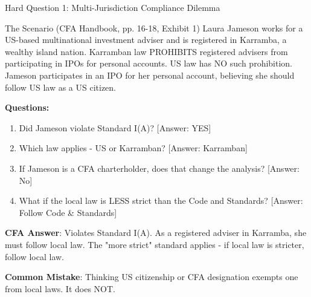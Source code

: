 \documentclass{beamer}
\begin{document}
	\begin{frame}{Hard Question 1: Multi-Jurisdiction Compliance Dilemma}
		\begin{block}{The Scenario (CFA Handbook, pp. 16-18, Exhibit 1)}
			Laura Jameson works for a US-based multinational investment adviser and is registered in Karramba, a wealthy island nation. Karramban law PROHIBITS registered advisers from participating in IPOs for personal accounts. US law has NO such prohibition. Jameson participates in an IPO for her personal account, believing she should follow US law as a US citizen.
		\end{block}
		
		\vspace{0.2cm}
		\textbf{Questions:}
		\begin{enumerate}
			\item Did Jameson violate Standard I(A)? \textcolor{cfared}{[Answer: YES]}
			\item Which law applies - US or Karramban? \textcolor{cfared}{[Answer: Karramban]}
			\item If Jameson is a CFA charterholder, does that change the analysis? \textcolor{cfared}{[Answer: No]}
			\item What if the local law is LESS strict than the Code and Standards? \textcolor{cfared}{[Answer: Follow Code \& Standards]}
		\end{enumerate}
		
		\vspace{0.2cm}
		\textcolor{cfablue}{\textbf{CFA Answer}}: Violates Standard I(A). As a registered adviser in Karramba, she must follow local law. The "more strict" standard applies - if local law is stricter, follow local law.
		
		\vspace{0.1cm}
		\textcolor{cfared}{\textbf{Common Mistake}}: Thinking US citizenship or CFA designation exempts one from local laws. It does NOT.
	\end{frame}
	
\end{document}
